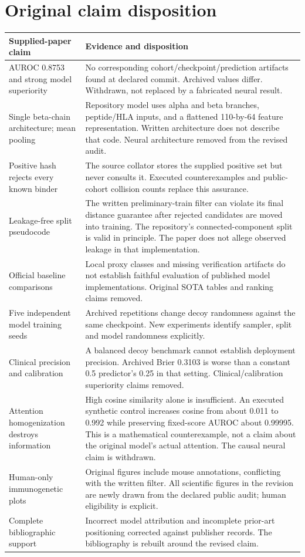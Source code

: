 \documentclass[11pt,a4paper]{article}
\begin{document}
\section{Original claim disposition}
\begin{longtable}{p{}p{}}
\toprule
Supplied-paper claim & Evidence and disposition\\\midrule
\endhead
AUROC 0.8753 and strong model superiority & No corresponding cohort/checkpoint/prediction artifacts found at declared commit. Archived values differ. Withdrawn, not replaced by a fabricated neural result.\\
Single beta-chain architecture; mean pooling & Repository model uses alpha and beta branches, peptide/HLA inputs, and a flattened 110-by-64 feature representation. Written architecture does not describe that code. Neural architecture removed from the revised audit.\\
Positive hash rejects every known binder & The source collator stores the supplied positive set but never consults it. Executed counterexamples and public-cohort collision counts replace this assurance.\\
Leakage-free split pseudocode & The written preliminary-train filter can violate its final distance guarantee after rejected candidates are moved into training. The repository's connected-component split is valid in principle. The paper does not allege observed leakage in that implementation.\\
Official baseline comparisons & Local proxy classes and missing verification artifacts do not establish faithful evaluation of published model implementations. Original SOTA tables and ranking claims removed.\\
Five independent model training seeds & Archived repetitions change decoy randomness against the same checkpoint. New experiments identify sampler, split and model randomness explicitly.\\
Clinical precision and calibration & A balanced decoy benchmark cannot establish deployment precision. Archived Brier 0.3103 is worse than a constant 0.5 predictor's 0.25 in that setting. Clinical/calibration superiority claims removed.\\
Attention homogenization destroys information & High cosine similarity alone is insufficient. An executed synthetic control increases cosine from about 0.011 to 0.992 while preserving fixed-score AUROC about 0.99995. This is a mathematical counterexample, not a claim about the original model's actual attention. The causal neural claim is withdrawn.\\
Human-only immunogenetic plots & Original figures include mouse annotations, conflicting with the written filter. All scientific figures in the revision are newly drawn from the declared public audit; human eligibility is explicit.\\
Complete bibliographic support & Incorrect model attribution and incomplete prior-art positioning corrected against publisher records. The bibliography is rebuilt around the revised claim.\\
\bottomrule
\end{longtable}
\end{document}
